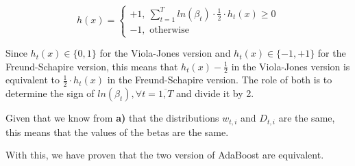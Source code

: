 \documentclass{article}
\newcommand{\<}{\langle}
\renewcommand{\>}{\rangle}
\theoremstyle{definition}
\begin{document}
$$h(x)=
\begin{cases}
+1, \ \sum_{t=1}^{T} ln(\beta_t) \cdot \frac{1}{2} \cdot h_t(x) \geq 0\\
-1, \text{ otherwise}
\end{cases}
$$

Since $h_t(x) \in \{0, 1\}$ for the Viola-Jones version and $h_t(x) \in \{-1, +1\}$ for the Freund-Schapire version, this means that $h_t(x) - \frac{1}{2}$ in the Viola-Jones version is equivalent to $\frac{1}{2} \cdot h_t(x)$ in the Freund-Schapire version. The role of both is to determine the sign of $ln(\beta_t), \forall t = \overline{1, T}$ and divide it by 2.

Given that we know from \textbf{a)} that the distributions $w_{t,i}$ and $D_{t,i}$ are the same, this means that the values of the betas are the same. 

With this, we have proven that the two version of AdaBoost are equivalent.
\end{document}
